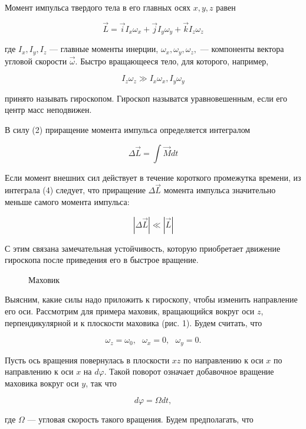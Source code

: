 \documentclass[14pt]{article}
\begin{document}
Момент импульса твердого тела в его главных осях $x, y, z$ равен

\begin{equation}
\vec{L} = \vec{i}I_x\omega_x + \vec{j}I_y\omega_y + \vec{k}I_z\omega_z
\end{equation}

\noindent где $I_x, I_y, I_z$ --- главные моменты инерции, $\omega_x, \omega_y, \omega_z,$ --- компоненты вектора угловой скорости 
$\vec{\omega}$. Быстро вращающееся тело, для которого, например,

$$I_z\omega_z \gg I_x\omega_x, I_y\omega_y$$

\noindent принято называть гироскопом. Гироскоп называтся уравновешенным, если его центр масс неподвижен.

В силу (2) приращение момента импульса определяется интегралом

\begin{equation}
\Delta \vec{L} = \int\vec{M}dt
\end{equation}

\noindent Если момент внешних сил действует в течение короткого промежутка времени, из интеграла (4) следует, что приращение $\Delta\vec{L}$ момента импульса значительно меньше самого момента импульса:

\begin{equation}
|\Delta\vec{L}| \ll |\vec{L}|
\end{equation}

\noindent С этим связана замечательная устойчивость, которую приобретает движение гироскопа после приведения его в быстрое вращение.

\begin{figure}[h!]
	\caption{Маховик}
	\label{fig:image}
\end{figure} 

Выясним, какие силы надо приложить к гироскопу, чтобы изменить направление его оси. Рассмотрим для примера маховик, вращающийся вокруг оси $z$, перпендикулярной и к плоскости маховика (рис. 1). Будем считать, что

$$\omega_z = \omega_0, ~~~\omega_x = 0, ~~~\omega_y = 0.$$

\noindent Пусть ось вращения повернулась в плоскости $xz$ по направлению к оси $x$ по направлению к оси $x$ на $d\varphi$. Такой поворот означает добавочное вращение маховика вокруг оси $y$, так что 

$$d\varphi = \Omega dt,$$

\noindent где $\Omega$ --- угловая скорость такого вращения. Будем предполагать, что 
\end{document}
